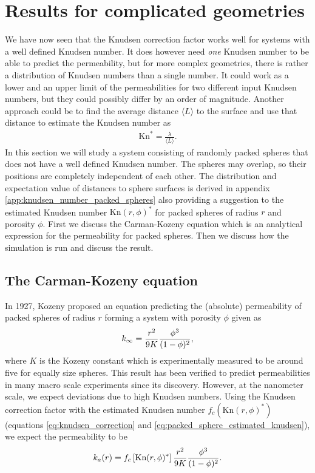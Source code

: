 \section{Results for complicated geometries}
We have now seen that the Knudsen correction factor works well for systems with a well defined Knudsen number. It does however need \textit{one} Knudsen number to be able to predict the permeability, but for more complex geometries, there is rather a distribution of Knudsen numbers than a single number. It could work as a lower and an upper limit of the permeabilities for two different input Knudsen numbers, but they could possibly differ by an order of magnitude. Another approach could be to find the average distance $\langle L\rangle$ to the surface and use that distance to estimate the Knudsen number as
\begin{align}
    \text{Kn}^* = \frac{\lambda}{\langle L \rangle}.
\end{align}
In this section we will study a system consisting of randomly packed spheres  that does not have a well defined Knudsen number. The spheres may overlap, so their positions are completely independent of each other. The distribution and expectation value of distances to sphere surfaces is derived in appendix \ref{app:knudsen_number_packed_spheres} also providing a suggestion to the estimated Knudsen number $\text{Kn}(r,\phi)^*$ for packed spheres of radius $r$ and porosity $\phi$. First we discuss the Carman-Kozeny equation which is an analytical expression for the permeability for packed spheres. Then we discuss how the simulation is run and discuss the result.
\subsection{The Carman-Kozeny equation}
In 1927, Kozeny proposed an equation predicting the (absolute) permeability of packed spheres of radius $r$ forming a system with porosity $\phi$ given as
\begin{align}
	k_\infty = {r^2 \over 9K} {\phi^3 \over (1 - \phi)^2},
\end{align}
where $K$ is the Kozeny constant which is experimentally measured to be around five for equally size spheres\cite{carman1937fluid}. This result has been verified to predict permeabilities in many macro scale experiments since its discovery. However, at the nanometer scale, we expect deviations due to high Knudsen numbers. Using the Knudsen correction factor with the estimated Knudsen number $f_c(\text{Kn}(r,\phi)^*)$ (equations \eqref{eq:knudsen_correction} and \eqref{eq:packed_sphere_estimated_knudsen}), we expect the permeability to be
\begin{align}
    k_a(r) = f_c\left[\text{Kn}(r,\phi)^*\right]{r^2 \over 9K} {\phi^3 \over (1 - \phi)^2}.
\end{align}
